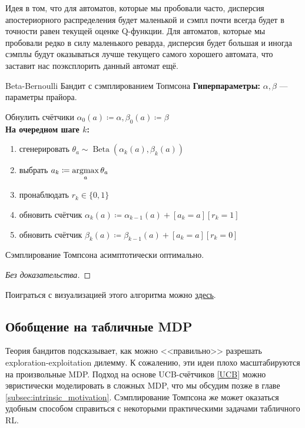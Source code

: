 Идея в том, что для автоматов, которые мы пробовали часто, дисперсия апостериорного распределения будет маленькой и сэмпл почти всегда будет в точности равен текущей оценке Q-функции. Для автоматов, которые мы пробовали редко в силу маленького реварда, дисперсия будет большая и иногда сэмплы будут оказываться лучше текущего самого хорошего автомата, что заставит нас поэксплорить данный автомат ещё.

\begin{algorithm}{Beta-Bernoulli Бандит с сэмплированием Топмсона}
\textbf{Гиперпараметры:} $\alpha, \beta$ --- параметры прайора.

\vspace{0.3cm}
Обнулить счётчики $\alpha_0(a) \coloneqq \alpha, \beta_0(a) \coloneqq \beta$ \\
\textbf{На очередном шаге $k$:}
\begin{enumerate}
    \item сгенерировать $\theta_a \sim \operatorname{Beta}(\alpha_k(a), \beta_k(a))$
    \item выбрать $a_k \coloneqq \mathop{\mathrm{argmax}}\limits_{a} \theta_a$
    \item пронаблюдать $r_k \in \{0, 1\}$
    \item обновить счётчик $\alpha_k(a) \coloneqq \alpha_{k-1}(a) + [a_k = a][r_k = 1]$
    \item обновить счётчик $\beta_k(a) \coloneqq \beta_{k-1}(a) + [a_k = a][r_k = 0]$
\end{enumerate}
\end{algorithm}

\begin{theorem}
Сэмплирование Томпсона асимптотически оптимально.
\begin{proof}[Без доказательства]\end{proof}
\end{theorem}

\begin{example}
Поиграться с визуализацией этого алгоритма можно \href{https://learnforeverlearn.com/bandits/}{здесь}.
\end{example}

\subsection{Обобщение на табличные MDP}

Теория бандитов подсказывает, как можно <<правильно>> разрешать exploration-exploitation дилемму. К сожалению, эти идеи плохо масштабируются на произвольные MDP. Подход на основе UCB-счётчиков \eqref{UCB} можно эвристически моделировать в сложных MDP, что мы обсудим позже в главе \ref{subsec:intrinsic_motivation}. Сэмплирование Томпсона же может оказаться удобным способом справиться с некоторыми практическими задачами табличного RL.

